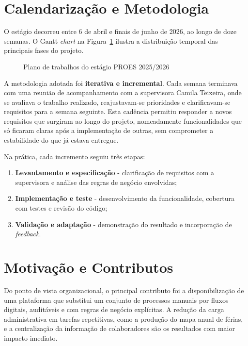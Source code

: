 \documentclass[12pt, a4paper, twoside, openright]{report}
\begin{document}
\section{Calendarização e Metodologia}

O estágio decorreu entre 6 de abril e finais de junho de 2026, ao longo de doze semanas.
O Gantt \textit{chart} na Figura~\ref{fig:gantt} ilustra a distribuição temporal das principais
fases do projeto.

\begin{figure}[H]
  \centering
  \caption{Plano de trabalhos do estágio PROES 2025/2026}
  \label{fig:gantt}
\end{figure}

A metodologia adotada foi \textbf{iterativa e incremental}. Cada semana terminava com
uma reunião de acompanhamento com a supervisora Camila Teixeira, onde se avaliava
o trabalho realizado, reajustavam-se prioridades e clarificavam-se requisitos para a
semana seguinte. Esta cadência permitiu responder a novos requisitos que surgiram 
ao longo do projeto, nomeadamente funcionalidades que só ficaram claras após a
implementação de outras, sem comprometer a estabilidade do que já estava entregue.

Na prática, cada incremento seguiu três etapas:

\begin{enumerate}
  \item \textbf{Levantamento e especificação} - clarificação de requisitos com a supervisora
        e análise das regras de negócio envolvidas;
  \item \textbf{Implementação e teste} - desenvolvimento da funcionalidade, cobertura
        com testes e revisão do código;
  \item \textbf{Validação e adaptação} - demonstração do resultado e incorporação
        de \textit{feedback}.
\end{enumerate}

\section{Motivação e Contributos}

Do ponto de vista organizacional, o principal contributo foi a disponibilização de uma
plataforma que substitui um conjunto de processos manuais por fluxos digitais,
auditáveis e com regras de negócio explícitas. A redução da carga administrativa
em tarefas repetitivas, como a produção do mapa anual de férias, e a centralização
da informação de colaboradores são os resultados com maior impacto imediato.
\end{document}
